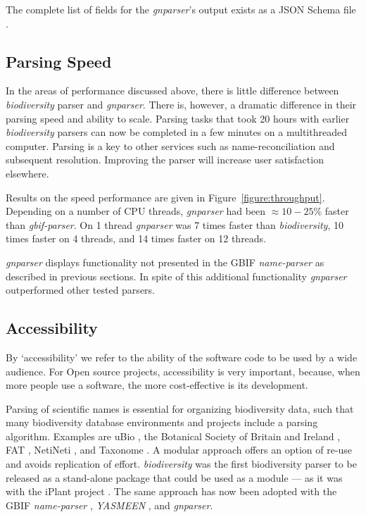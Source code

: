 \documentclass{bmcart}
\begin{document}
The complete list of fields for the \textit{gnparser}'s output exists as
a JSON Schema file \cite{gnparser-json}.

\subsection*{Parsing Speed}

In the areas of performance discussed above, there is little difference between
\textit{biodiversity} parser and \textit{gnparser}. There is, however, a
dramatic difference in their parsing speed and ability to scale. Parsing tasks
that took 20 hours with earlier \textit{biodiversity} parsers can now be
completed in a few minutes on a multithreaded computer. Parsing is a key to
other services such as name-reconciliation and subsequent resolution.
Improving the parser will increase user satisfaction elsewhere.

Results on the speed performance are given in Figure~\ref{figure:throughput}.
Depending on a number of CPU threads, \textit{gnparser} had been
$\approx10-25\%$ faster than \textit{gbif-parser}. On 1 thread
\textit{gnparser} was 7 times faster than \textit{biodiversity}, 10 times
faster on 4 threads, and 14 times faster on 12 threads.

\textit{gnparser} displays functionality not presented in the GBIF
\textit{name-parser} as described in previous sections. In spite of this
additional functionality \textit{gnparser} outperformed other tested parsers.

\subsection*{Accessibility}

By `accessibility' we refer to the ability of the software code to be used by a
wide audience. For Open source projects, accessibility is very important,
because, when more people use a software, the more cost-effective is its
development.

Parsing of scientific names is essential for organizing biodiversity data, such
that many biodiversity database environments and projects include a parsing
algorithm. Examples are uBio \cite{ubio:parser}, the Botanical Society of
Britain and Ireland \cite{botsociety:parser}, FAT \cite{Sautter2006}, NetiNeti
\cite{Akella2012}, and Taxonome \cite{Kluyver2013}. A modular approach offers
an option of re-use and avoids replication of effort. \textit{biodiversity} was
the first biodiversity parser to be released as a stand-alone package that
could be used as a module --- as it was with the iPlant project \cite{Boyle2013}.
The same approach has now been adopted with the GBIF \textit{name-parser}
\cite{gbifNameParser}, \textit{YASMEEN} \cite{VandenBerghe2015}, and
\textit{gnparser}.
\end{document}
